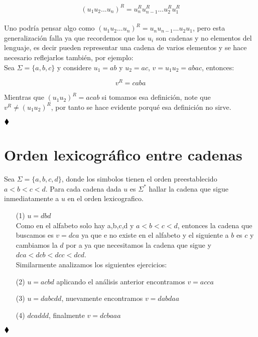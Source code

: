$$(u_1u_2...u_n)^R=u_n^Ru_{n-1}^R...u_2^Ru_1^R$$\\

Uno podría pensar algo como $(u_1u_2...u_n)^R=u_nu_{n-1}...u_2u_1$, pero esta generalización falla ya que recordemos que los $u_i$ son cadenas y no elementos del lenguaje, es decir pueden representar una cadena de varios elementos y se hace necesario reflejarlos también, por ejemplo:\\

Sea $\Sigma=\{a,b,c\}$ y considere $u_1=ab$ y $u_2=ac$, $v=u_1u_2=abac$, entonces:

$$v^R=caba$$

Mientras que $(u_1u_2)^R=acab$ si tomamos esa definición, note que $v^R\neq (u_1u_2)^R$, por tanto se hace evidente porqué esa definición no sirve.

$\hfill \blacklozenge$

\section{Orden lexicográfico entre cadenas}

Sea $\Sigma=\{a,b,c,d\}$, donde los simbolos tienen el orden preestablecido $a<b<c<d.$ Para cada cadena dada $u$ es $\Sigma^*$ hallar la cadena que sigue inmediatamente a $u$ en el orden lexicografico.

\begin{enumerate}
\item[(1)] $u=d b d$\\

Como en el alfabeto solo hay a,b,c,d y $a<b<c<d$, entonces la cadena que buscamos es $v=dca$ ya que e no existe en el alfabeto y el siguiente a $b$ es $c$ y cambiamos la $d$ por a ya que necesitamos la cadena que sigue y $dca<dcb<dcc<dcd$.\\

Similarmente analizamos los siguientes ejercicios:\\

\item[(2)] $u=acbd$ aplicando el análisis anterior encontramos $v=acca$\\

\item[(3)] $u=dabcdd$, nuevamente encontramos $v=dabdaa$\\

\item[(4)] $dcaddd$, finalmente $v=dcbaaa$
\end{enumerate}
$\hfill \blacklozenge$

